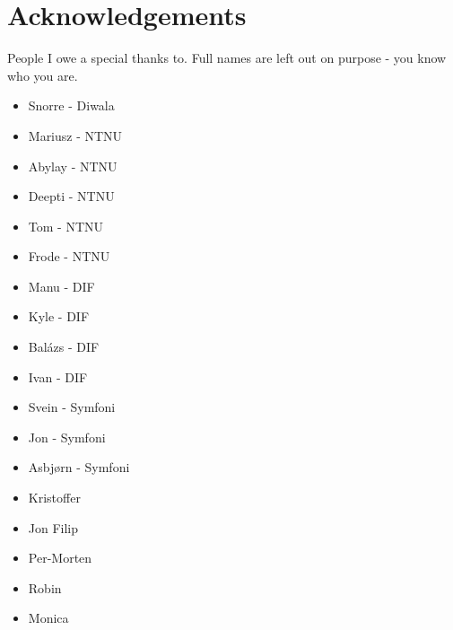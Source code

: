 \chapter*{Acknowledgements}

People I owe a special thanks to. Full names are left out on purpose - you know who you are.

\begin{itemize}
\tightlist
\item
    Snorre - Diwala
\item
    Mariusz - NTNU
\item
    Abylay - NTNU
\item
    Deepti - NTNU
\item
    Tom - NTNU
\item
    Frode - NTNU
\item
    Manu - DIF
\item
    Kyle - DIF
\item
    Balázs - DIF
\item
    Ivan - DIF
\item
    Svein - Symfoni
\item
    Jon - Symfoni
\item
    Asbjørn - Symfoni
\item
    Kristoffer
\item
    Jon Filip
\item
    Per-Morten
\item
    Robin
\item
    Monica
\end{itemize}
